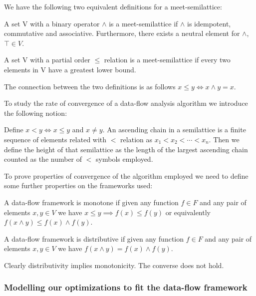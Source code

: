 We have the following two equivalent definitions for a meet-semilattice:

\begin{definition}
A set V with a binary operator $\land$ is a meet-semilattice if $\land$ is idempotent, commutative and associative. Furthermore, there exists a neutral element for $\land$, $\top \in V$.
\end{definition}

\begin{definition}
A set V with a partial order $\leq$ relation is a meet-semilattice if every two elements in V have a greatest lower bound.
\end{definition}

The connection between the two definitions is as follows $x \leq y \iff x \land y = x$.

To study the rate of convergence of a data-flow analysis algorithm we introduce the following notion:

\begin{definition}
Define $x < y \iff x \leq y$ and $x \neq y$. An ascending chain in a semilattice is a finite sequence of elements related with $<$ relation as $x_1 < x_2 < \cdots < x_n$. Then we define the height of that semilattice as the length of the largest ascending chain counted as the number of $<$ symbols employed.
\end{definition}

To prove properties of convergence of the algorithm employed we need to define some further properties on the frameworks used:

\begin{definition}
A data-flow framework is monotone if given any function $f \in F$ and any pair of elements $x,y \in V$ we have $x \leq y \implies f(x) \leq f(y)$ or equivalently $f(x \land y) \leq f(x) \land f(y)$.
\end{definition}

\begin{definition}
A data-flow framework is distributive if given any function $f \in F$ and any pair of elements $x,y \in V$ we have $f(x \land y) = f(x) \land f(y)$.
\end{definition}

Clearly distributivity implies monotonicity. The converse does not hold.

\subsubsection{Modelling our optimizations to fit the data-flow framework}

